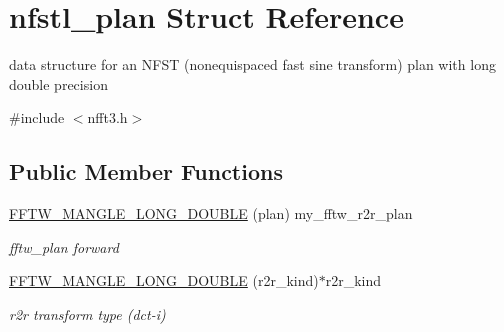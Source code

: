 \hypertarget{structnfstl__plan}{\section{nfstl\-\_\-plan Struct Reference}
\label{structnfstl__plan}
}


data structure for an N\-F\-S\-T (nonequispaced fast sine transform) plan with long double precision  




{\ttfamily \#include $<$nfft3.\-h$>$}

\subsection*{Public Member Functions}
\begin{DoxyCompactItemize}
\item 
\hypertarget{structnfstl__plan_a2c07f20560a3969129916e3d30239227}{\hyperlink{structnfstl__plan_a2c07f20560a3969129916e3d30239227}{F\-F\-T\-W\-\_\-\-M\-A\-N\-G\-L\-E\-\_\-\-L\-O\-N\-G\-\_\-\-D\-O\-U\-B\-L\-E} (plan) my\-\_\-fftw\-\_\-r2r\-\_\-plan}\label{structnfstl__plan_a2c07f20560a3969129916e3d30239227}

\begin{DoxyCompactList}\small\item\em fftw\-\_\-plan forward \end{DoxyCompactList}\item 
\hypertarget{structnfstl__plan_a6285132e89913685bc2f7366fd79e769}{\hyperlink{structnfstl__plan_a6285132e89913685bc2f7366fd79e769}{F\-F\-T\-W\-\_\-\-M\-A\-N\-G\-L\-E\-\_\-\-L\-O\-N\-G\-\_\-\-D\-O\-U\-B\-L\-E} (r2r\-\_\-kind)$\ast$r2r\-\_\-kind}\label{structnfstl__plan_a6285132e89913685bc2f7366fd79e769}

\begin{DoxyCompactList}\small\item\em r2r transform type (dct-\/i) \end{DoxyCompactList}\end{DoxyCompactItemize}

